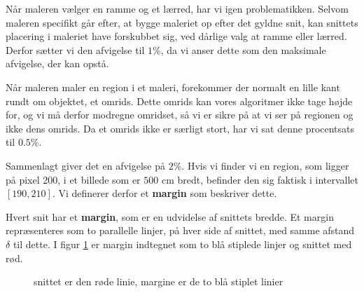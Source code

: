 {Når maleren vælger en ramme og et lærred, har vi igen problematikken.
Selvom maleren specifikt går efter, at bygge maleriet op efter det gyldne
snit, kan snittets placering i maleriet have forskubbet sig, ved dårlige
valg at ramme eller lærred. Derfor sætter vi den afvigelse til $1\%$, da
vi anser dette som den maksimale afvigelse, der kan opstå.

Når maleren maler en region i et maleri, forekommer der normalt en
lille kant rundt om objektet, et omrids. Dette omrids kan vores
algoritmer ikke tage højde for, og vi må derfor modregne omridset, så vi
er sikre på at vi ser på regionen og ikke dens omrids. Da et omrids ikke
er særligt stort, har vi sat denne procentsats til $0.5\%$.

Sammenlagt giver det en afvigelse på $2\%$. Hvis vi finder vi en region,
som ligger på pixel 200, i et billede som er $500$ cm bredt, befinder
den sig faktisk i intervallet $[190,210]$. Vi definerer derfor et
\textbf{margin} som beskriver dette.

\begin{definition}
    Hvert snit har et \textbf{margin}, som er en udvidelse af snittets
    bredde. Et margin repræsenteres som to parallelle linjer, på hver
    side af snittet, med samme afstand $\delta$ til dette.  I figur
    \ref{margin} er margin indtegnet som to blå stiplede linjer og
    snittet med rød.
\end{definition}

\begin{figure}[hb]
    \setlength\fboxsep{0pt}
    \setlength\fboxrule{0.5pt}
    \centering
    \caption[]{snittet er den røde linie, margine er de to blå stiplet linier}
    \label{margin}
\end{figure}

}
